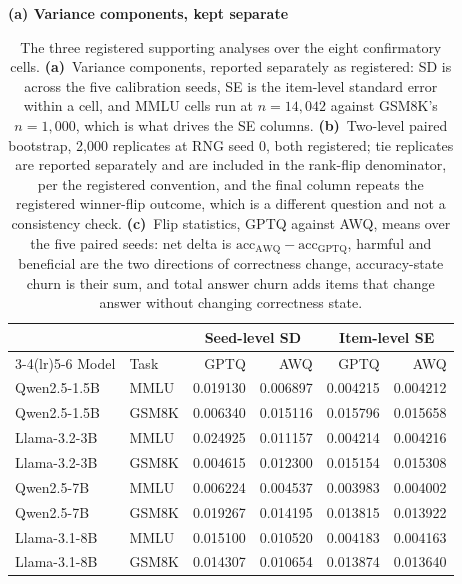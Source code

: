 \begin{table}[!tp]
\centering
\footnotesize
\setlength{\abovecaptionskip}{0pt}
\begingroup\let\normalsize\footnotesize
\caption{The three registered supporting analyses over the eight confirmatory
cells. \textbf{(a)}~Variance components, reported separately as registered: SD
is across the five calibration seeds, SE is the item-level standard error within
a cell, and MMLU cells run at $n = 14{,}042$ against GSM8K's $n = 1{,}000$,
which is what drives the SE columns. \textbf{(b)}~Two-level paired bootstrap,
2{,}000 replicates at RNG seed 0, both registered; tie replicates are reported
separately and are included in the rank-flip denominator, per the registered
convention, and the final column repeats the registered winner-flip outcome,
which is a different question and not a consistency check.
\textbf{(c)}~Flip statistics, GPTQ against AWQ, means over the five paired
seeds: net delta is
$\mathrm{acc}_{\mathrm{AWQ}} - \mathrm{acc}_{\mathrm{GPTQ}}$, harmful and
beneficial are the two directions of correctness change, accuracy-state churn is
their sum, and total answer churn adds items that change answer without changing
correctness state.}
\label{tab:h3-supporting}
\endgroup

\textbf{(a) Variance components, kept separate}\par\smallskip
\begin{tabular}{llrrrr}
\toprule
& & \multicolumn{2}{c}{Seed-level SD} & \multicolumn{2}{c}{Item-level SE} \\
\cmidrule(lr){3-4}\cmidrule(lr){5-6}
Model & Task & GPTQ & AWQ & GPTQ & AWQ \\
\midrule
Qwen2.5-1.5B & MMLU  & 0.019130 & 0.006897 & 0.004215 & 0.004212 \\
Qwen2.5-1.5B & GSM8K & 0.006340 & 0.015116 & 0.015796 & 0.015658 \\
Llama-3.2-3B & MMLU  & 0.024925 & 0.011157 & 0.004214 & 0.004216 \\
Llama-3.2-3B & GSM8K & 0.004615 & 0.012300 & 0.015154 & 0.015308 \\
Qwen2.5-7B   & MMLU  & 0.006224 & 0.004537 & 0.003983 & 0.004002 \\
Qwen2.5-7B   & GSM8K & 0.019267 & 0.014195 & 0.013815 & 0.013922 \\
Llama-3.1-8B & MMLU  & 0.015100 & 0.010520 & 0.004183 & 0.004163 \\
Llama-3.1-8B & GSM8K & 0.014307 & 0.010654 & 0.013874 & 0.013640 \\
\bottomrule
\end{tabular}


\end{table}
